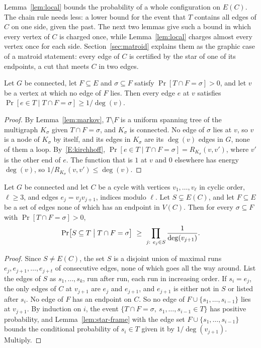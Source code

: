 Lemma~\ref{lem:local} bounds the probability of a whole configuration on $E(C)$. The chain rule needs less: a lower bound for the event that $T$ contains all edges of $C$ on one side, given the past. The next two lemmas give such a bound in which every vertex of $C$ is charged once, while Lemma~\ref{lem:local} charges almost every vertex once for each side. Section~\ref{sec:matroid} explains them as the graphic case of a matroid statement: every edge of $C$ is certified by the star of one of its endpoints, a cut that meets $C$ in two edges.

\begin{lemma}\label{lem:star-frame}
Let $G$ be connected, let $F\subseteq E$ and $\sigma\subseteq F$ satisfy $\Pr[T\cap F=\sigma]>0$, and let $v$ be a vertex at which no edge of $F$ lies. Then every edge $e$ at $v$ satisfies $\Pr[e\in T\mid T\cap F=\sigma]\ge1/\deg(v)$.
\end{lemma}

\begin{proof}
By Lemma~\ref{lem:markov}, $T\setminus F$ is a uniform spanning tree of the multigraph $K_\sigma$ given $T\cap F=\sigma$, and $K_\sigma$ is connected. No edge of $\sigma$ lies at $v$, so $v$ is a node of $K_\sigma$ by itself, and its edges in $K_\sigma$ are its $\deg(v)$ edges in $G$, none of them a loop. By~\ref{E:kirchhoff}, $\Pr[e\in T\mid T\cap F=\sigma]=R_{K_\sigma}(v,v')$, where $v'$ is the other end of $e$. The function that is $1$ at $v$ and $0$ elsewhere has energy $\deg(v)$, so $1/R_{K_\sigma}(v,v')\le\deg(v)$.
\end{proof}

\begin{lemma}\label{lem:framed-cycle}
Let $G$ be connected and let $C$ be a cycle with vertices $v_1,\dots,v_\ell$ in cyclic order, $\ell\ge3$, and edges $e_j=v_jv_{j+1}$, indices modulo $\ell$. Let $S\subsetneq E(C)$, and let $F\subseteq E$ be a set of edges none of which has an endpoint in $V(C)$. Then for every $\sigma\subseteq F$ with $\Pr[T\cap F=\sigma]>0$,
\[
  \Pr\bigl[S\subseteq T\bigm|T\cap F=\sigma\bigr]\ \ge\ \prod_{j:\ e_j\in S}\frac1{\deg(v_{j+1})} .
\]
\end{lemma}

\begin{proof}
Since $S\ne E(C)$, the set $S$ is a disjoint union of maximal runs $e_j,e_{j+1},\dots,e_{j+t}$ of consecutive edges, none of which goes all the way around. List the edges of $S$ as $s_1,\dots,s_k$, run after run, each run in increasing order. If $s_i=e_j$, the only edges of $C$ at $v_{j+1}$ are $e_j$ and $e_{j+1}$, and $e_{j+1}$ is either not in $S$ or listed after $s_i$. No edge of $F$ has an endpoint on $C$. So no edge of $F\cup\{s_1,\dots,s_{i-1}\}$ lies at $v_{j+1}$. By induction on $i$, the event $\{T\cap F=\sigma,\ s_1,\dots,s_{i-1}\in T\}$ has positive probability, and Lemma~\ref{lem:star-frame} with the edge set $F\cup\{s_1,\dots,s_{i-1}\}$ bounds the conditional probability of $s_i\in T$ given it by $1/\deg(v_{j+1})$. Multiply.
\end{proof}

